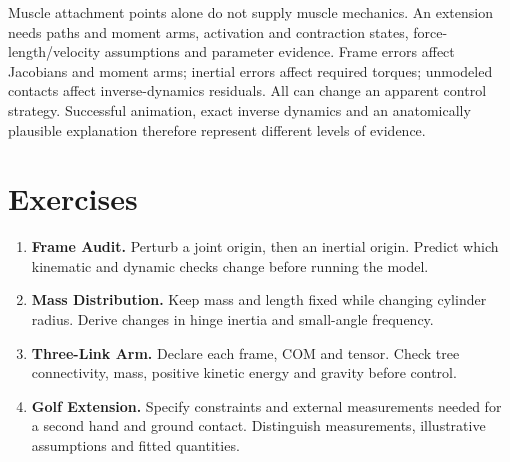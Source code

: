 Muscle attachment points alone do not supply muscle mechanics. An extension
needs paths and moment arms, activation and contraction states,
force-length/velocity assumptions and parameter evidence. Frame errors affect
Jacobians and moment arms; inertial errors affect required torques; unmodeled
contacts affect inverse-dynamics residuals. All can change an apparent control
strategy. Successful animation, exact inverse dynamics and an anatomically
plausible explanation therefore represent different levels of evidence.

\section*{Exercises}
\begin{enumerate}
 \item \textbf{Frame Audit.} Perturb a joint origin, then an inertial origin.
 Predict which kinematic and dynamic checks change before running the model.
 \item \textbf{Mass Distribution.} Keep mass and length fixed while changing
 cylinder radius. Derive changes in hinge inertia and small-angle frequency.
 \item \textbf{Three-Link Arm.} Declare each frame, COM and tensor. Check tree
 connectivity, mass, positive kinetic energy and gravity before control.
 \item \textbf{Golf Extension.} Specify constraints and external measurements
 needed for a second hand and ground contact. Distinguish measurements,
 illustrative assumptions and fitted quantities.
\end{enumerate}
